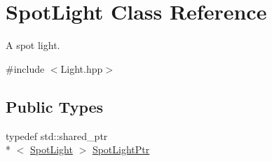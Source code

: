 \hypertarget{classSpotLight}{\section{Spot\+Light Class Reference}
\label{classSpotLight}
}


A spot light.  




{\ttfamily \#include $<$Light.\+hpp$>$}

\subsection*{Public Types}
\begin{DoxyCompactItemize}
\item 
typedef std\+::shared\+\_\+ptr\\*
$<$ \hyperlink{classSpotLight}{Spot\+Light} $>$ \hyperlink{classSpotLight_ac20419604c70594b85e7c019effd1998}{Spot\+Light\+Ptr}
\end{DoxyCompactItemize}
